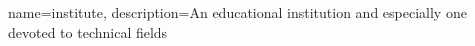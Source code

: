 {
        name=institute,
        description={An educational institution and especially one devoted to technical fields \parencite{merriam_webster_institute}}
}